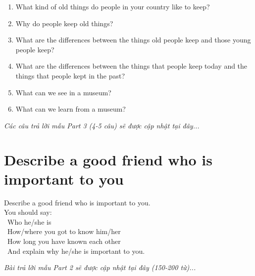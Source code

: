 \begin{ieltsprompt}
\begin{enumerate}[itemsep=4pt]
    \item What kind of old things do people in your country like to keep?
    \item Why do people keep old things?
    \item What are the differences between the things old people keep and those young people keep?
    \item What are the differences between the things that people keep today and the things that people kept in the past?
    \item What can we see in a museum?
    \item What can we learn from a museum?
\end{enumerate}
\end{ieltsprompt}

\vspace{1em}
\textit{Các câu trả lời mẫu Part 3 (4-5 câu) sẽ được cập nhật tại đây...}
\vspace{2em}

\section{Describe a good friend who is important to you}
\begin{ieltsprompt}
Describe a good friend who is important to you. \\
You should say: \\
\textbullet\ Who he/she is \\
\textbullet\ How/where you got to know him/her \\
\textbullet\ How long you have known each other \\
\textbullet\ And explain why he/she is important to you. \\
\end{ieltsprompt}

\vspace{1em}
\textit{Bài trả lời mẫu Part 2 sẽ được cập nhật tại đây (150-200 từ)...}
\vspace{2em}

